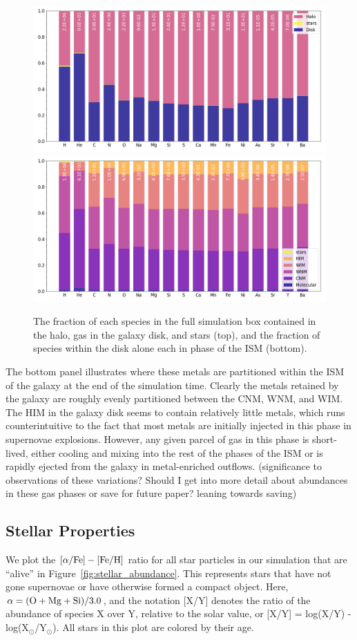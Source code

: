 \documentclass[twocolumn]{aastex61}
\begin{document}
\begin{figure}
\includegraphics[width=0.9\linewidth]{species_bar.png}\\
\includegraphics[width=0.9\linewidth]{species_bar_disk.png}
\caption{The fraction of each species in the full simulation box contained in the halo, gas in the galaxy disk, and stars (top), and the fraction of species within the disk alone each in phase of the ISM (bottom).}
\label{fig:species_fractions}
\end{figure}

The bottom panel illustrates where these metals are partitioned within the ISM of the galaxy at the end of the simulation time. Clearly the metals retained by the galaxy are roughly evenly partitioned between the CNM, WNM, and WIM. The HIM in the galaxy disk seems to contain relatively little metals, which runs counterintuitive to the fact that most metals are initially injected in this phase in supernovae explosions. However, any given parcel of gas in this phase is short-lived, either cooling and mixing into the rest of the phases of the ISM or is rapidly ejected from the galaxy in metal-enriched outflows. (significance to observations of these variations? Should I get into more detail about abundances in these gas phases or save for future paper? leaning towards saving)

\subsection{Stellar Properties}
We plot the $[\alpha / {\rm Fe}]-[\rm{Fe}/\rm{H}]$ ratio for all star particles in our simulation that are ``alive'' in Figure~\ref{fig:stellar_abundance}. This represents stars that have not gone supernovae or have otherwise formed a compact object. Here, $\alpha = (\rm{O} + \rm{Mg} + \rm{Si})/3.0$, and the notation [X/Y] denotes the ratio of the abundance of species X over Y, relative to the solar value, or [X/Y] = log(X/Y) - log(X$_{\odot}$/Y$_{\odot}$). All stars in this plot are colored by their age.
\end{document}
